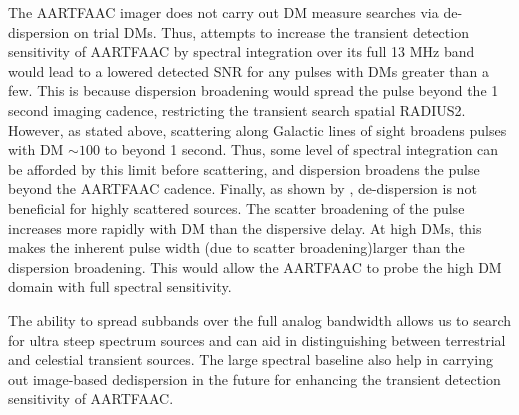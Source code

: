 \documentclass[referee]{aa}
\begin{document}

The AARTFAAC imager does not carry  out DM measure searches via de-dispersion on
trial DMs.   Thus, attempts to  increase the transient detection  sensitivity of
AARTFAAC  by spectral integration  over its  full 13  MHz band  would lead  to a
lowered  detected SNR  for any  pulses with  DMs greater  than a  few.   This is
because dispersion broadening would spread the pulse beyond the 1 second imaging
cadence, restricting  the transient search  spatial RADIUS2. However,  as stated
above, scattering along Galactic lines of  sight broadens pulses with DM $\sim$$100$ to
beyond 1  second. Thus, some  level of spectral  integration can be  afforded by
this  limit before  scattering, and  dispersion  broadens the  pulse beyond  the
AARTFAAC   cadence.    Finally,   as  shown   by   \citet{hassall2013detecting},
de-dispersion  is not  beneficial  for highly  scattered  sources.  The  scatter
broadening  of the  pulse increases  more rapidly  with DM  than  the dispersive
delay.   At high  DMs,  this makes  the  inherent pulse  width  (due to  scatter
broadening)larger than the dispersion  broadening. This would allow the AARTFAAC
to probe the high DM domain with full spectral sensitivity.

The  ability to  spread subbands  over the  full analog  bandwidth allows  us to
search for  ultra steep spectrum sources  and can aid  in distinguishing between
terrestrial and  celestial transient sources.  The large  spectral baseline also
help in  carrying out image-based dedispersion  in the future  for enhancing the
transient detection sensitivity of AARTFAAC.
\end{document}
